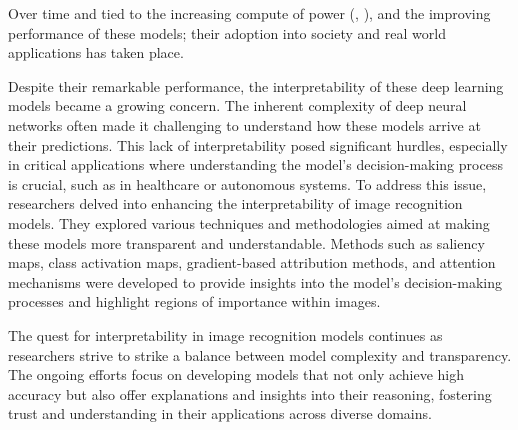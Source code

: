\noindent Over time and tied to the increasing compute of power (\cite{schaller1997moore}, 
\cite{theis2017end}), and the improving performance of these models; their adoption into society 
and real world applications has taken place. 

\noindent Despite their remarkable performance, the interpretability of these deep learning models 
became a growing concern. The inherent complexity of deep neural networks often made it 
challenging to understand how these models arrive at their predictions. This lack of 
interpretability posed significant hurdles, especially in critical applications where 
understanding the model's decision-making process is crucial, such as in healthcare or 
autonomous systems.
To address this issue, researchers delved into enhancing the interpretability of image recognition 
models. They explored various techniques and methodologies aimed at making these models more 
transparent and understandable. Methods such as saliency maps, class activation maps, gradient-based 
attribution methods, and attention mechanisms were developed to provide insights into the model's 
decision-making processes and highlight regions of importance within images.

The quest for interpretability in image recognition models continues as researchers strive to 
strike a balance between model complexity and transparency. The ongoing efforts focus on developing 
models that not only achieve high accuracy but also offer explanations and insights into their 
reasoning, fostering trust and understanding in their applications across diverse domains.

\newpage

\newpage
